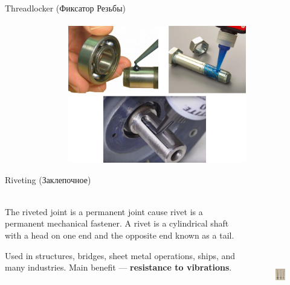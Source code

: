 \documentclass[aspectratio=169]{beamer}
\begin{document}
\begin{frame}[t]{Threadlocker (Фиксатор Резьбы)}
    \framesubtitle{}
    \vspace{-0.6cm}
    \begin{figure}[H]
        \centering\includegraphics[height=6cm,width=1\textwidth,keepaspectratio]{threadlocker.png}
        \label{fig:threadlocker.png}
    \end{figure}
\end{frame}

\begin{frame}[t]{Riveting (Заклепочное)}
    \framesubtitle{}
    \begin{columns}[T,onlytextwidth]
        \begin{column}{0.49\textwidth}
            The riveted joint is a permanent joint cause rivet is a permanent mechanical fastener. A rivet is a cylindrical shaft with a head on one end and the opposite end known as a tail.
            \medskip

            Used in structures, bridges, sheet metal operations, ships, and many industries. Main benefit --- \textbf{resistance to vibrations}.
        \end{column}
        \begin{column}{0.49\textwidth}
            \vspace{-1cm}
            \begin{figure}[H]
                \centering\includegraphics[height=6cm,width=1\textwidth,keepaspectratio]{rivetrivet.jpg}
                \label{fig:rivetrivet.jpg}
            \end{figure}
        \end{column}
    \end{columns}
\end{frame}
\end{document}
